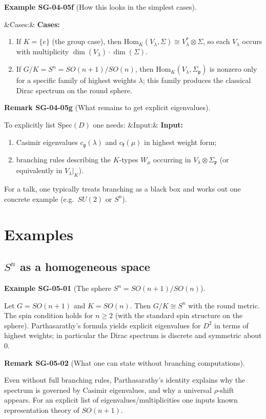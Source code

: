 \documentclass[10pt, letterpaper]{article}
\newcommand{\Hom}{\mathrm{Hom}}
\newenvironment{romanenum}[1][]
  {%
    \ifx&#1&
    \else
      \textbf{#1}\quad
    \fi
    \begin{enumerate}[label=\roman*)]
  }
  {%
    \end{enumerate}%
  }
\newcommand{\CustomHeading}[3]{%
  \par\medskip\noindent%
  \textbf{#1 #2} \textnormal{(#3)}.\enskip%
}
\newenvironment{REM}[2]{\begin{unitbox}\CustomHeading{Remark}{#1}{#2}}{\end{unitbox}}
\newenvironment{EXA}[2]{\begin{unitbox}\CustomHeading{Example}{#1}{#2}}{\end{unitbox}}
\begin{document}
\begin{EXA}{SG-04-05f}{How this looks in the simplest cases}
\begin{romanenum}[Cases:]
\item If $K=\{e\}$ (the group case), then $\Hom_K(V_\lambda,\Sigma)\cong V_\lambda^*\otimes \Sigma$, so each $V_\lambda$ occurs with multiplicity $\dim(V_\lambda)\cdot \dim(\Sigma)$.
\item If $G/K=S^n=SO(n+1)/SO(n)$, then $\Hom_K(V_\lambda,\Sigma_{\mathfrak p})$ is nonzero only for a specific family of highest weights $\lambda$; this family produces the classical Dirac spectrum on the round sphere.
\end{romanenum}
\end{EXA}

\begin{REM}{SG-04-05g}{What remains to get explicit eigenvalues}
To explicitly list $\mathrm{Spec}(D)$ one needs:
\begin{romanenum}[Input:]
\item Casimir eigenvalues $c_{\mathfrak g}(\lambda)$ and $c_{\mathfrak k}(\mu)$ in highest weight form;
\item branching rules describing the $K$-types $W_\mu$ occurring in $V_\lambda\otimes \Sigma_{\mathfrak p}$ (or equivalently in $V_\lambda|_K$).
\end{romanenum}
For a talk, one typically treats branching as a black box and works out one concrete example (e.g.\ $SU(2)$ or $S^n$).
\end{REM}


\section{Examples}

\subsection{$S^n$ as a homogeneous space}
\begin{EXA}{SG-05-01}{The sphere $S^n=SO(n+1)/SO(n)$}
Let $G=SO(n+1)$ and $K=SO(n)$. Then $G/K\cong S^n$ with the round metric.
The spin condition holds for $n\ge 2$ (with the standard spin structure on the sphere).
Parthasarathy's formula yields explicit eigenvalues for $D^2$ in terms of highest weights; in particular the Dirac spectrum is discrete and symmetric about $0$.
\end{EXA}

\begin{REM}{SG-05-02}{What one can state without branching computations}
Even without full branching rules, Parthasarathy's identity explains why the spectrum is governed by Casimir eigenvalues,
and why a universal $\rho$-shift appears. For an explicit list of eigenvalues/multiplicities one inputs known representation theory of $SO(n+1)$.
\end{REM}
\end{document}

